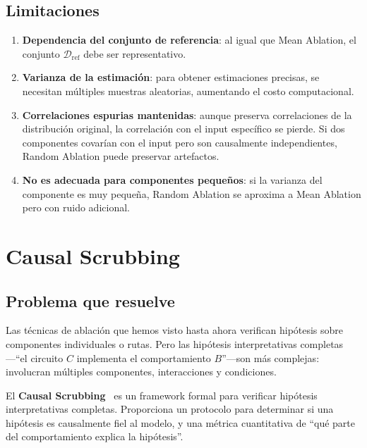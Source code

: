 \documentclass[11pt,a4paper]{report}
\theoremstyle{definition}
\begin{document}
\section{Limitaciones}

\begin{enumerate}
    \item \textbf{Dependencia del conjunto de referencia}: al igual que Mean Ablation, el conjunto $\mathcal{D}_{\text{ref}}$ debe ser representativo.
    \item \textbf{Varianza de la estimación}: para obtener estimaciones precisas, se necesitan múltiples muestras aleatorias, aumentando el costo computacional.
    \item \textbf{Correlaciones espurias mantenidas}: aunque preserva correlaciones de la distribución original, la correlación con el input específico se pierde. Si dos componentes covarían con el input pero son causalmente independientes, Random Ablation puede preservar artefactos.
    \item \textbf{No es adecuada para componentes pequeños}: si la varianza del componente es muy pequeña, Random Ablation se aproxima a Mean Ablation pero con ruido adicional.
\end{enumerate}

\newpage

\chapter{Causal Scrubbing}
\label{ch:causal-scrubbing}

\section{Problema que resuelve}

Las técnicas de ablación que hemos visto hasta ahora verifican hipótesis sobre componentes individuales o rutas. Pero las hipótesis interpretativas completas---``el circuito $C$ implementa el comportamiento $B$''---son más complejas: involucran múltiples componentes, interacciones y condiciones.

El \textbf{Causal Scrubbing}~\cite{redwood2022causalscrubbing,geiger2023causalscrubbing} es un framework formal para verificar hipótesis interpretativas completas. Proporciona un protocolo para determinar si una hipótesis es causalmente fiel al modelo, y una métrica cuantitativa de ``qué parte del comportamiento explica la hipótesis''.
\end{document}
